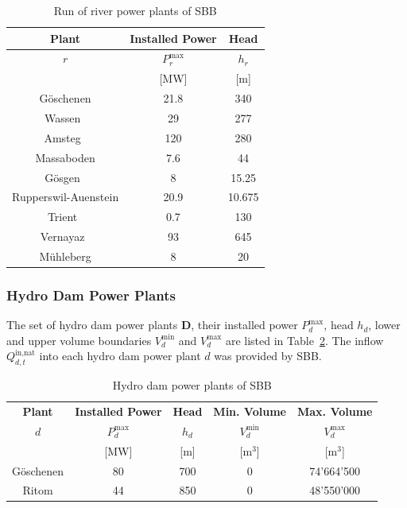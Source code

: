 \begin{table}[]
    \centering
    \begin{tabular}{|c|c|c|}
        \hline
         \textbf{Plant} & \textbf{Installed Power} & \textbf{Head} \\ \hline
         $r$ & $P^{\text{max}}_{r}$ & $h_r$ \\
         & [MW] & [m] \\\hline
            Göschenen            & 21.8 & 340    \\\hline
            Wassen~              & 29   & 277    \\\hline
            Amsteg~              & 120  & 280    \\\hline
            Massaboden           & 7.6  & 44     \\\hline
            Gösgen~              & 8    & 15.25   \\\hline
            Rupperswil-Auenstein & 20.9 & 10.675   \\\hline
            Trient~              & 0.7  & 130      \\\hline
            Vernayaz~            & 93   & 645      \\\hline
            Mühleberg            & 8    & 20     \\\hline 
    \end{tabular}
    \caption{Run of river power plants of SBB}
    \label{tab:sbb_ror}
\end{table}

\subsubsection{Hydro Dam Power Plants}
The set of hydro dam power plants $\textbf{D}$, their installed power $P^{\text{max}}_{d}$, head $h_d$, lower and upper volume boundaries $V^{\text{min}}_{d}$ and $V^{\text{max}}_{d}$ are listed in Table~\ref{tab:sbb_dam}. The inflow $Q^{\text{in,nat}}_{d,t}$ into each hydro dam power plant $d$ was provided by SBB. 

\begin{table}[]
    \centering
    \begin{tabular}{|c|c|c|c|c|}
        \hline
         \textbf{Plant} & \textbf{Installed Power} & \textbf{Head} & \textbf{Min. Volume} & \textbf{Max. Volume} \\
          $d$ & $P^{\text{max}}_{d}$ & $h_d$ & $V^{\text{min}}_{d}$ & $V^{\text{max}}_{d}$\\
          & [MW] & [m] & [$\si{\cubic\metre}$] & [$\si{\cubic\metre}$] \\\hline
            Göschenen   & 80 & 700 & 0 & 74’664’500 \\\hline
            Ritom       & 44 & 850 & 0 & 48’550’000   \\\hline
    \end{tabular}
    \caption{Hydro dam power plants of SBB}
    \label{tab:sbb_dam}
\end{table}

